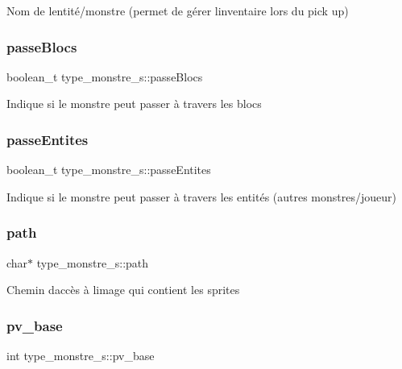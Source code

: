Nom de l\textquotesingle{}entité/monstre (permet de gérer l\textquotesingle{}inventaire lors du pick up) \mbox{\label{structtype__monstre__s_a0f60370f9ae95fff9ab024fbf6485df6}} 
\subsubsection{\texorpdfstring{passe\+Blocs}{passeBlocs}}
{\footnotesize\ttfamily boolean\+\_\+t type\+\_\+monstre\+\_\+s\+::passe\+Blocs}

Indique si le monstre peut passer à travers les blocs \mbox{\label{structtype__monstre__s_a03f34ddaadae9f002130e70844f142f1}} 
\subsubsection{\texorpdfstring{passe\+Entites}{passeEntites}}
{\footnotesize\ttfamily boolean\+\_\+t type\+\_\+monstre\+\_\+s\+::passe\+Entites}

Indique si le monstre peut passer à travers les entités (autres monstres/joueur) \mbox{\label{structtype__monstre__s_ad507cb527c078d7a5c565b67d842e968}} 
\subsubsection{\texorpdfstring{path}{path}}
{\footnotesize\ttfamily char$\ast$ type\+\_\+monstre\+\_\+s\+::path}

Chemin d\textquotesingle{}accès à l\textquotesingle{}image qui contient les sprites \mbox{\label{structtype__monstre__s_a37d1cae3dfb8de6ce15f2601a93cd1cc}} 
\subsubsection{\texorpdfstring{pv\+\_\+base}{pv\_base}}
{\footnotesize\ttfamily int type\+\_\+monstre\+\_\+s\+::pv\+\_\+base}

